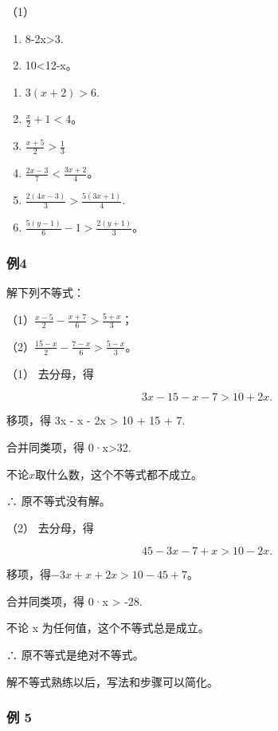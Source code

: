 （1）

\begin{enumerate}[start=3]
\item
  8-2x\textgreater3.
\item
  10\textless12-x。
\end{enumerate}

\begin{enumerate}[start=5]
\item
  \(3(x+2)>6.\)
\item
  \(\frac{x}{2} + 1 < 4\)。
\item
  \(\frac{x + 5}{2} >\frac{1}{3}\)
\item
  \(\frac{2x - 3}{7} < \frac{3x + 2}{4}\)。
\item
  \(\frac{2(4x - 3)}{3} >\frac{5(3x + 1)}{4}.\)
\item
  \(\frac{5(y - 1)}{6} - 1 > \frac{2(y + 1)}{3}\)。
\end{enumerate}

\subsubsection{例4}

解下列不等式：

（1）\(\frac{x - 5}{2} - \frac{x + 7}{6} > \frac{5 + x}{3}\)；

（2）\(\frac{15 - x}{2} - \frac{7 - x}{6} > \frac{5 - x}{3}\)。

 （1） 去分母，得

\[
3 x - 15 - x - 7 > 10 + 2 x.
\]

移项，得 3x - x - 2x \textgreater{} 10 + 15 + 7.

合并同类项，得 0·x\textgreater32.

不论\(x\)取什么数，这个不等式都不成立。

∴ 原不等式没有解。

（2） 去分母，得

\[
45 - 3 x - 7 + x > 10 - 2 x.
\]

移项，得\(-3x + x + 2x > 10 - 45 + 7\)。

合并同类项，得 0·x \textgreater{} -28.

不论 x 为任何值，这个不等式总是成立。

∴ 原不等式是绝对不等式。

解不等式熟练以后，写法和步骤可以简化。

\subsubsection{例 5}


